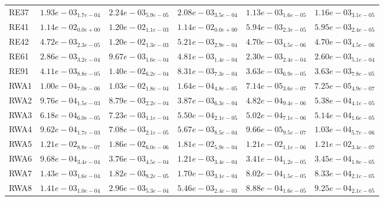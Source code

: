 \documentclass{article}
\begin{document}
\begin{table}
\begin{scriptsize}
\begin{tabular}{llllll}
RE37 & $  1.93e-03_{ 1.7e-04}$ & $  2.24e-03_{ 5.9e-05}$ & $  2.08e-03_{ 3.5e-04}$ & \cellcolor{gray95}$  1.13e-03_{ 1.6e-05}$ & \cellcolor{gray25}$  1.16e-03_{ 3.1e-05}$ \\
RE41 & $  1.14e-02_{ 0.0e+00}$ & $  1.20e-02_{ 1.1e-03}$ & $  1.14e-02_{ 0.0e+00}$ & \cellcolor{gray95}$  5.94e-03_{ 2.3e-05}$ & \cellcolor{gray25}$  5.95e-03_{ 2.4e-05}$ \\
RE42 & $  4.72e-03_{ 2.3e-05}$ & $  1.20e-02_{ 1.3e-03}$ & $  5.21e-03_{ 2.9e-04}$ & \cellcolor{gray95}$  4.70e-03_{ 4.5e-06}$ & \cellcolor{gray25}$  4.70e-03_{ 4.5e-06}$ \\
RE61 & $  2.86e-03_{ 3.2e-04}$ & $  9.67e-03_{ 1.6e-04}$ & $  4.81e-03_{ 1.4e-04}$ & \cellcolor{gray95}$  2.30e-03_{ 2.4e-04}$ & \cellcolor{gray25}$  2.60e-03_{ 5.1e-04}$ \\
RE91 & $  4.11e-03_{ 8.8e-05}$ & $  1.40e-02_{ 6.2e-04}$ & $  8.31e-03_{ 7.3e-04}$ & \cellcolor{gray95}$  3.63e-03_{ 6.9e-05}$ & \cellcolor{gray25}$  3.63e-03_{ 7.8e-05}$ \\
RWA1 & $  1.00e-04_{ 7.0e-06}$ & $  1.03e-02_{ 1.8e-04}$ & $  1.64e-04_{ 4.8e-05}$ & \cellcolor{gray95}$  7.14e-05_{ 3.6e-07}$ & \cellcolor{gray25}$  7.25e-05_{ 4.9e-07}$ \\
RWA2 & $  9.76e-04_{ 1.5e-03}$ & $  8.79e-03_{ 2.2e-04}$ & $  3.87e-03_{ 6.3e-04}$ & \cellcolor{gray95}$  4.82e-04_{ 9.4e-06}$ & \cellcolor{gray25}$  5.38e-04_{ 4.1e-05}$ \\
RWA3 & $  6.18e-04_{ 6.0e-05}$ & $  7.23e-03_{ 1.1e-04}$ & $  5.50e-04_{ 2.1e-05}$ & \cellcolor{gray95}$  5.02e-04_{ 7.1e-06}$ & \cellcolor{gray25}$  5.14e-04_{ 1.6e-05}$ \\
RWA4 & $  9.62e-04_{ 1.7e-03}$ & $  7.08e-03_{ 2.1e-05}$ & $  5.67e-03_{ 8.5e-04}$ & \cellcolor{gray95}$  9.66e-05_{ 9.5e-07}$ & \cellcolor{gray25}$  1.03e-04_{ 5.7e-06}$ \\
RWA5 & \cellcolor{gray25}$  1.21e-02_{ 8.8e-07}$ & $  1.86e-02_{ 6.0e-06}$ & $  1.81e-02_{ 5.9e-04}$ & $  1.21e-02_{ 1.1e-06}$ & \cellcolor{gray95}$  1.21e-02_{ 3.4e-07}$ \\
RWA6 & $  9.68e-04_{ 3.4e-04}$ & $  3.76e-03_{ 4.5e-04}$ & $  1.21e-03_{ 3.4e-04}$ & \cellcolor{gray95}$  3.41e-04_{ 1.2e-05}$ & \cellcolor{gray25}$  3.45e-04_{ 1.8e-05}$ \\
RWA7 & $  1.43e-03_{ 1.6e-04}$ & $  1.82e-03_{ 8.2e-05}$ & $  1.70e-03_{ 3.1e-04}$ & \cellcolor{gray95}$  8.02e-04_{ 1.5e-05}$ & \cellcolor{gray25}$  8.33e-04_{ 2.1e-05}$ \\
RWA8 & $  1.41e-03_{ 1.0e-04}$ & $  2.96e-03_{ 5.3e-04}$ & $  5.46e-03_{ 2.4e-03}$ & \cellcolor{gray95}$  8.88e-04_{ 1.6e-05}$ & \cellcolor{gray25}$  9.25e-04_{ 2.1e-05}$ \\

\end{tabular}
\end{scriptsize}
\end{table}
\end{document}
